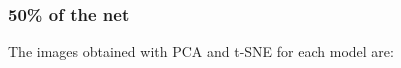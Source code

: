 \documentclass[12pt]{article} %
\begin{document}
\subsubsection {50\%  of the net}
The images obtained with PCA and t-SNE for each model are:\\

\begin{minipage}{0.5\textwidth}
\begin{figure}[H] %
 \end{figure}
\end{minipage}
\begin{minipage}{0.5\textwidth}
\begin{figure}[H] %
 \end{figure}
\end{minipage}
\end{document}
